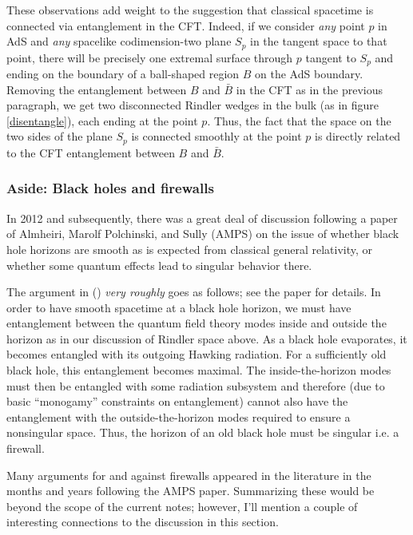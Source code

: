 \documentclass[12pt,epsf]{article}
\begin{document}
These observations add weight to the suggestion that classical spacetime is connected via entanglement in the CFT. Indeed, if we consider {\it any} point $p$ in AdS and {\it any} spacelike codimension-two plane $S_p$ in the tangent space to that point, there will be precisely one extremal surface through $p$ tangent to $S_p$ and ending on the boundary of a ball-shaped region $B$ on the AdS boundary. Removing the entanglement between $B$ and $\bar{B}$ in the CFT as in the previous paragraph, we get two disconnected Rindler wedges in the bulk (as in figure \ref{disentangle}), each ending at the point $p$. Thus, the fact that the space on the two sides of the plane $S_p$ is connected smoothly at the point $p$ is directly related to the CFT entanglement between $B$ and $\bar{B}$.

\subsubsection*{Aside: Black holes and firewalls}

In 2012 and subsequently, there was a great deal of discussion following a paper \cite{AMPS} of Almheiri, Marolf Polchinski, and Sully (AMPS) on the issue of whether black hole horizons are smooth as is expected from classical general relativity, or whether some quantum effects lead to singular behavior there.

The argument in (\cite{AMPS}) {\it very roughly} goes as follows; see the paper for details. In order to have smooth spacetime at a black hole horizon, we must have entanglement between the quantum field theory modes inside and outside the horizon as in our discussion of Rindler space above. As a black hole evaporates, it becomes entangled with its outgoing Hawking radiation. For a sufficiently old black hole, this entanglement becomes maximal. The inside-the-horizon modes must then be entangled with some radiation subsystem and therefore (due to basic ``monogamy'' constraints on entanglement) cannot also have the entanglement with the outside-the-horizon modes required to ensure a nonsingular space. Thus, the horizon of an old black hole must be singular i.e. a firewall.

Many arguments for and against firewalls appeared in the literature in the months and years following the AMPS paper. Summarizing these would be beyond the scope of the current notes; however, I'll mention a couple of interesting connections to the discussion in this section.
\end{document}
